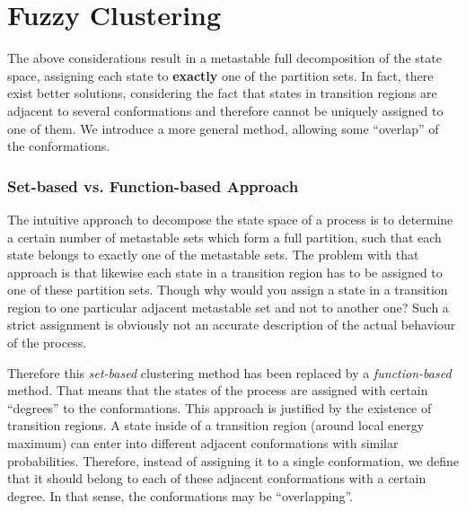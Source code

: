 \section{Fuzzy Clustering}
\label{sec:fuzzy}

The above considerations result in a metastable full decomposition of the state space, assigning each state to \textbf{exactly} one of the partition sets.
In fact, there exist better solutions, considering the fact that states in transition regions are adjacent to several conformations and therefore cannot be uniquely assigned to one of them.
We introduce a more general method, allowing some ``overlap'' of the conformations.


\subsubsection*{Set-based vs. Function-based Approach}
The intuitive approach to decompose the state space of a process is to determine a certain number of metastable sets which form a full partition, such that each state belongs to exactly one of the metastable sets.
The problem with that approach is that likewise each state in a transition region has to be assigned to one of these partition sets. Though why would you assign a state in a transition region to one particular adjacent metastable set and not to another one? Such a strict assignment is obviously not an accurate description of the actual behaviour of the process.

Therefore this \textit{set-based} clustering method has been replaced by a \textit{function-based} method.
That means that the states of the process are assigned with certain ``degrees'' to the conformations.
This approach is justified by the existence of transition regions.
A state inside of a transition region (around local energy maximum) can enter into different adjacent conformations with similar probabilities.
Therefore, instead of assigning it to a single conformation, we define that it should belong to each of these adjacent conformations with a certain degree.
In that sense, the conformations may be ``overlapping''.


